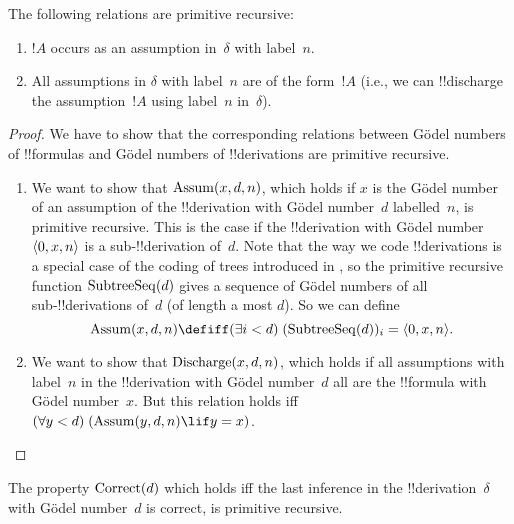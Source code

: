 \documentclass[../../../include/open-logic-section]{subfiles}
\begin{document}
\begin{prop}
  The following relations are primitive recursive:
  \begin{enumerate}
  \item $!A$ occurs as an assumption in~$\delta$ with label~$n$.
  \item All assumptions in $\delta$ with label~$n$ are of the form~$!A$
    (i.e., we can !!{discharge} the assumption~$!A$ using label~$n$
    in~$\delta$).
  \end{enumerate}
\end{prop}

\begin{proof}
  We have to show that the corresponding relations between G\"odel
  numbers of !!{formula}s and G\"odel numbers of !!{derivation}s are
  primitive recursive.
  \begin{enumerate}
  \item We want to show that $\mathrm{Assum}(x, d, n)$, which holds if $x$
    is the G\"odel number of an assumption of the !!{derivation} with
    G\"odel number~$d$ labelled~$n$, is primitive recursive.  This is
    the case if the !!{derivation} with G\"odel number~$\langle 0, x,
      n \rangle$ is a sub-!!{derivation} of~$d$. Note that the way we code
    !!{derivation}s is a special case of the coding of trees introduced in
    , so the primitive recursive function
    $\mathrm{SubtreeSeq}(d)$ gives a sequence of G\"odel numbers of all
    sub-!!{derivation}s of~$d$ (of length a most $d$). So we can
    define
    \[
    \fn{Assum}(x, d, n) \defiff \bexists{i<d}{(\fn{SubtreeSeq}(d))_i =
      \tuple{0, x, n}}.
    \]
  \item We want to show that $\mathrm{Discharge}(x, d, n)$, which holds if
    all assumptions with label~$n$ in the !!{derivation} with G\"odel
    number~$d$ all are the !!{formula} with G\"odel number~$x$.  But
    this relation holds iff $\bforall{y<d}{(\fn{Assum}(y, d, n) \lif y
      = x)}$.
  \end{enumerate}
\end{proof}

\begin{prop}
  The property $\mathrm{Correct}(d)$ which holds iff the last inference in
  the !!{derivation}~$\delta$ with G\"odel number~$d$ is correct, is
  primitive recursive.
\end{prop}
\end{document}
